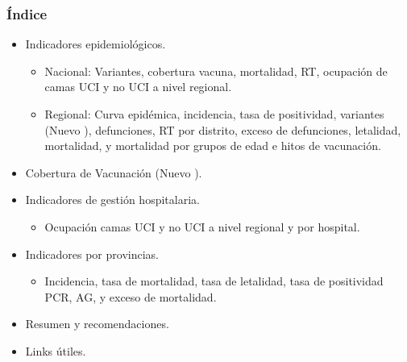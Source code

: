 \documentclass[xcolor=table]{beamer}
\begin{document}
	\setcounter{subsection}{1}
	\begin{frame}[label=indice]
		\frametitle{Índice}
		\vspace{-.5cm}
		\begin{itemize}
			\item Indicadores epidemiológicos.
			\begin{itemize}
				\item Nacional: Variantes, cobertura vacuna, mortalidad, RT, ocupación de camas UCI y no UCI a nivel regional. \hyperlink{epi_nacional}{}
				\item Regional: Curva epidémica, incidencia, tasa de positividad, variantes ({\color{mycolor5}Nuevo} \hyperlink{variantes}{}), defunciones, RT por distrito, exceso de defunciones, letalidad, mortalidad, y mortalidad por grupos de edad e hitos de vacunación.  \hyperlink{epi_cusco}{} 
			\end{itemize} 
			\item Cobertura de Vacunación ({\color{mycolor5}Nuevo} \hyperlink{cobertura_vacuna}{}). 
			\item Indicadores de gestión hospitalaria.
			\begin{itemize}
				\item Ocupación camas UCI y no UCI a nivel regional y por hospital. \hyperlink{camas}{} 
			\end{itemize}
			\item Indicadores por provincias.
			\begin{itemize}
				\item Incidencia, tasa de mortalidad, tasa de letalidad, tasa de positividad PCR, AG, y exceso de mortalidad. \hyperlink{provincias}{}
			\end{itemize}
			\item Resumen y recomendaciones. \hyperlink{resumen}{} \hyperlink{recomendaciones}{}
			\item Links útiles. \hyperlink{links}{} \hfill \hyperlink{vacunas_60}{}
		\end{itemize}
	\end{frame}
	
\end{document}

